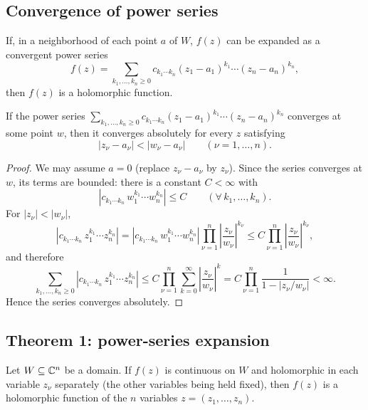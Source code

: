 \subsection*{Convergence of power series}

\begin{note}
If, in a neighborhood of each point $a$ of $W$, $f(z)$ can be expanded as a
convergent power series
\[
  f(z) = \sum_{k_1, \dots, k_n \ge 0}
    c_{k_1 \cdots k_n} (z_1 - a_1)^{k_1} \cdots (z_n - a_n)^{k_n},
\]
then $f(z)$ is a holomorphic function.
\end{note}

\begin{proposition}\label{cl:abel}
If the power series $\sum_{k_1, \dots, k_n \ge 0} c_{k_1 \cdots k_n}
(z_1 - a_1)^{k_1} \cdots (z_n - a_n)^{k_n}$ converges at some point $w$, then it
converges absolutely for every $z$ satisfying
\[
  |z_\nu - a_\nu| < |w_\nu - a_\nu| \qquad (\nu = 1, \dots, n).
\]
\end{proposition}

\begin{proof}
We may assume $a = 0$ (replace $z_\nu - a_\nu$ by $z_\nu$). Since the series
converges at $w$, its terms are bounded: there is a constant $C < \infty$ with
\[
  |c_{k_1 \cdots k_n} \, w_1^{k_1} \cdots w_n^{k_n}| \le C
  \qquad (\forall\, k_1, \dots, k_n).
\]
For $|z_\nu| < |w_\nu|$,
\[
  |c_{k_1 \cdots k_n} \, z_1^{k_1} \cdots z_n^{k_n}|
  = |c_{k_1 \cdots k_n} \, w_1^{k_1} \cdots w_n^{k_n}|
    \prod_{\nu=1}^n \left| \frac{z_\nu}{w_\nu} \right|^{k_\nu}
  \le C \prod_{\nu=1}^n \left| \frac{z_\nu}{w_\nu} \right|^{k_\nu},
\]
and therefore
\[
  \sum_{k_1, \dots, k_n \ge 0} |c_{k_1 \cdots k_n} \, z_1^{k_1} \cdots z_n^{k_n}|
  \le C \prod_{\nu=1}^n \sum_{k=0}^\infty \left| \frac{z_\nu}{w_\nu} \right|^{k}
  = C \prod_{\nu=1}^n \frac{1}{1 - |z_\nu / w_\nu|} < \infty .
\]
Hence the series converges absolutely.
\end{proof}

\subsection*{Theorem 1: power-series expansion}

\begin{theorem}\label{thm:power-series}
Let $W \subseteq \mathbb{C}^n$ be a domain. If $f(z)$ is continuous on $W$ and
holomorphic in each variable $z_\nu$ separately (the other variables being held
fixed), then $f(z)$ is a holomorphic function of the $n$ variables
$z = (z_1, \dots, z_n)$.
\end{theorem}

